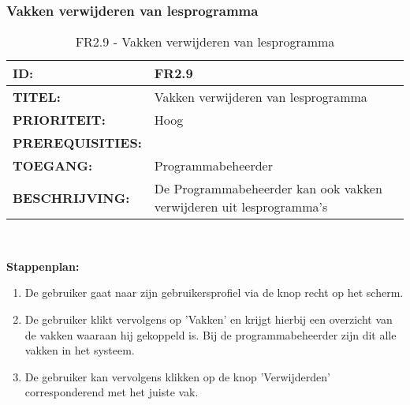 \subsubsection{Vakken verwijderen van lesprogramma}        
\noindent\begin{table}[H]
            \begin{tabular}{l | p{10cm}}
                \textbf{ID:} & FR2.9 \\ \hline
                \textbf{TITEL:} & Vakken verwijderen van lesprogramma\\ \hline
                \textbf{PRIORITEIT:} &  Hoog \\ \hline
                \textbf{PREREQUISITIES:} & \\ \hline
                \textbf{TOEGANG:} & Programmabeheerder \\ \hline
                \textbf{BESCHRIJVING:} & De Programmabeheerder kan ook vakken verwijderen uit lesprogramma’s \\ 
            \end{tabular}\\
            \caption{FR2.9 - Vakken verwijderen van lesprogramma}
            \label{tab:FR2.9 - Vakken verwijderen van lesprogramma}
        \end{table}    
        
\textbf{Stappenplan:}
	\begin{enumerate}
	\item De gebruiker gaat naar zijn gebruikersprofiel via de knop recht op het scherm.
	\item De gebruiker klikt vervolgens op 'Vakken' en krijgt hierbij een overzicht van de vakken waaraan hij gekoppeld is. Bij de programmabeheerder zijn dit alle vakken in het systeem.
	\item De gebruiker kan vervolgens klikken op de knop 'Verwijderden' corresponderend met het juiste vak.
	\end{enumerate}	    
        
\clearpage